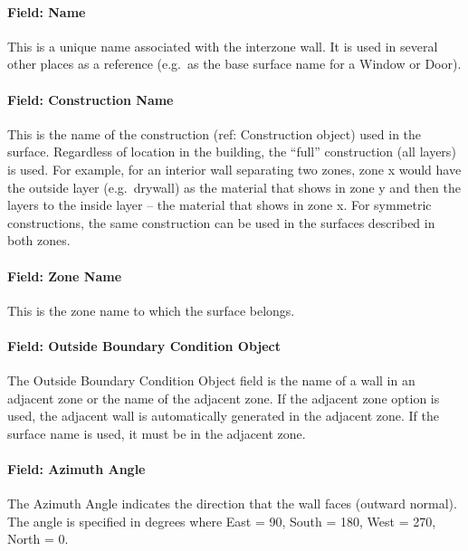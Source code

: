 \paragraph{Field: Name}\label{field-name-3-033}

This is a unique name associated with the interzone wall. It is used in several other places as a reference (e.g.~as the base surface name for a Window or Door).

\paragraph{Field: Construction Name}\label{field-construction-name-3}

This is the name of the construction (ref: Construction object) used in the surface. Regardless of location in the building, the ``full'' construction (all layers) is used. For example, for an interior wall separating two zones, zone x would have the outside layer (e.g.~drywall) as the material that shows in zone y and then the layers to the inside layer -- the material that shows in zone x. For symmetric constructions, the same construction can be used in the surfaces described in both zones.

\paragraph{Field: Zone Name}\label{field-zone-name-3-006}

This is the zone name to which the surface belongs.

\paragraph{Field: Outside Boundary Condition Object}\label{field-outside-boundary-condition-object}

The Outside Boundary Condition Object field is the name of a wall in an adjacent zone or the name of the adjacent zone. If the adjacent zone option is used, the adjacent wall is automatically generated in the adjacent zone. If the surface name is used, it must be in the adjacent zone.

\paragraph{Field: Azimuth Angle}\label{field-azimuth-angle-3}

The Azimuth Angle indicates the direction that the wall faces (outward normal). The angle is specified in degrees where East = 90, South = 180, West = 270, North = 0.

